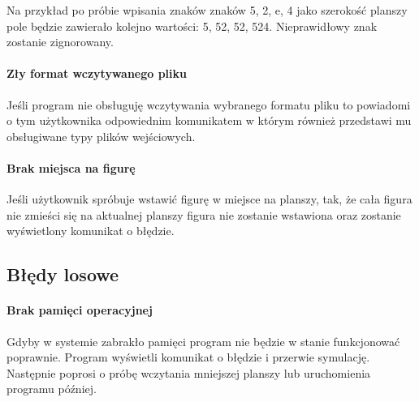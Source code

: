 \documentclass{report}
\begin{document}
Na przykład po próbie wpisania znaków znaków 5, 2, e, 4 jako szerokość planszy pole będzie zawierało kolejno wartości: 5, 52, 52, 524. Nieprawidłowy znak zostanie zignorowany.

\paragraph{Zły format wczytywanego pliku}
Jeśli program nie obsługuję wczytywania wybranego formatu pliku to powiadomi o tym użytkownika odpowiednim komunikatem w którym również przedstawi mu obsługiwane typy plików wejściowych.

\paragraph{Brak miejsca na figurę}
Jeśli użytkownik spróbuje wstawić figurę w miejsce na planszy, tak, że cała figura nie zmieści się na aktualnej planszy figura nie zostanie wstawiona oraz zostanie wyświetlony komunikat o błędzie.

\subsection{Błędy losowe}
\paragraph{Brak pamięci operacyjnej}
Gdyby w systemie zabrakło pamięci program nie będzie w stanie funkcjonować poprawnie. Program wyświetli komunikat o błędzie i przerwie symulację. Następnie poprosi o próbę wczytania mniejszej planszy lub uruchomienia programu później.
\end{document}
